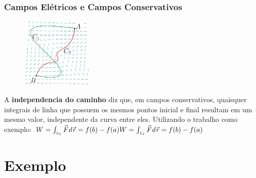 \documentclass{beamer}
\def\vec{\mathaccent "017E\relax }
\begin{document}
\begin{frame}
    \frametitle{Campos Elétricos e Campos Conservativos}
    
    
    \begin{figure} %
        \vspace{-35pt}
        \centering
        \caption{}
        \includegraphics[width=0.30\textwidth]{grafico-trabalho.png}
        \label{fig:grafico-trabalho}
    \end{figure}
    
    A \textbf{independencia do caminho} diz que, em campos conservativos, quaisquer integrais de 
    linha que possuem os mesmos pontos inicial e final resultam em um mesmo valor, independente da curva entre eles. 
    Utilizando o trabalho como exemplo:  
    \hfill \break
    \hfill \break
    $    
        W = \mathit{\int_{c_1} \vec{F} d\vec{r}} = f(b) - f(a) 
        \hfill \break
        W = \mathit{\int_{c_2} \vec{F} d\vec{r}} = f(b) - f(a) 
    $

\end{frame}

\section{Exemplo}
\end{document}
